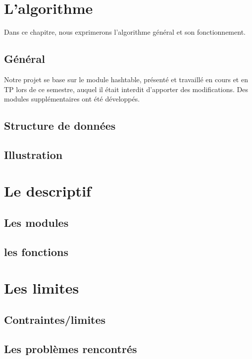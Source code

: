\documentclass[12pt, letterpaper]{report}
\begin{document}
\chapter{L'algorithme}
Dans ce chapitre, nous exprimerons l'algorithme général
 et son fonctionnement. 
\section{Général}

Notre projet se base sur le module hashtable, présenté et travaillé 
en cours et en TP lors de ce semestre, auquel il était interdit
 d'apporter des modifications.
 Des modules supplémentaires ont été développés.

\section{Structure de données}

\section{Illustration}

\chapter{Le descriptif}

\section{Les modules}

\section{les fonctions}

\chapter{Les limites}

\section{Contraintes/limites}

\section{Les problèmes rencontrés}
\end{document}
